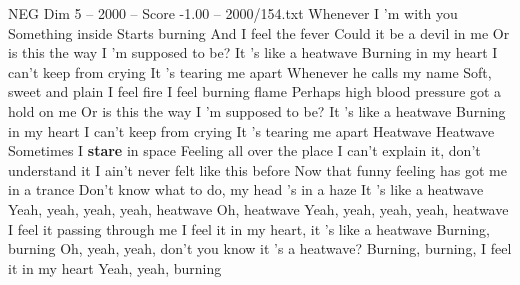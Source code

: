 \begin{textsample}{NEG Dim 5 – 2000 – Score -1.00 – 2000/154.txt}  \label{ex:f5_neg_035}
Whenever I 'm with you Something inside Starts burning And I feel the fever Could it be a devil in me Or is this the way I 'm supposed to be?
It 's like a heatwave Burning in my heart I can't keep from crying It 's tearing me apart Whenever he calls my name Soft, sweet and plain I feel fire I feel burning flame Perhaps high blood pressure got a hold on me Or is this the way I 'm supposed to be?
It 's like a heatwave Burning in my heart I can't keep from crying It 's tearing me apart Heatwave Heatwave Sometimes I \textbf{stare} in space Feeling all over the place I can't explain it, don't understand it I ain't never felt like this before Now that funny feeling has got me in a trance Don't know what to do, my head 's in a haze It 's like a heatwave Yeah, yeah, yeah, yeah, heatwave Oh, heatwave Yeah, yeah, yeah, yeah, heatwave I feel it passing through me I feel it in my heart, it 's like a heatwave Burning, burning Oh, yeah, yeah, don't you know it 's a heatwave?
Burning, burning, I feel it in my heart Yeah, yeah, burning

\end{textsample}

